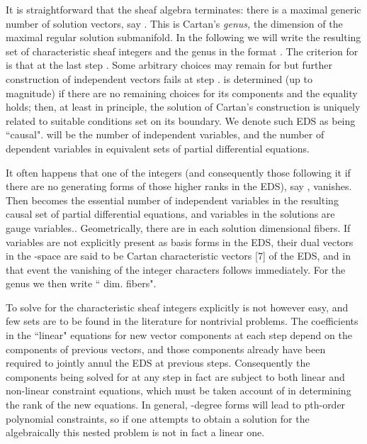 \documentclass[a4paper,a4paper]{article}
\begin{document}
        It is straightforward \cite{est89} that the sheaf algebra
terminates:  there is a maximal generic number of solution vectors,  say
\coordHE{}.  This is Cartan's {\itshape genus,  }the dimension of the maximal regular 
solution submanifold.  In the following we will write the resulting set of characteristic sheaf
integers and the genus in the format \coordHE{}.  The criterion for \coordHE{} is that at the last step \coordHE{}.  Some arbitrary choices may
remain for \coordHE{} but further construction of independent
vectors fails at step \coordHE{}.  \coordHE{} is determined  (up to magnitude)
if there are no remaining choices for its components and the equality
holds; then,  at least in principle,  the solution of Cartan's construction is
uniquely related to suitable conditions set on its boundary.  We denote
such EDS as being ``causal".   \coordHE{} will be the number of independent variables,
and \coordHE{} the number of dependent variables in equivalent sets of
partial differential equations.

        It often happens that one of the integers (and consequently
those following it if there are no generating forms of those higher
ranks in the EDS), say \coordHE{},  vanishes.  Then \coordHE{} becomes the essential number of
independent variables in the resulting causal set of partial
differential equations, and \coordHE{} variables in the solutions are gauge variables..
Geometrically,   there are in each solution \coordHE{}dimensional fibers.
If \coordHE{} variables are not explicitly present as basis forms in the EDS, their dual vectors
in the \coordHE{}-space are said to be Cartan characteristic vectors [7] of the
EDS,
and in that event the vanishing of the integer characters
\coordHE{} follows immediately.   For the genus \coordHE{} we then
write ``\coordHE{} dim. fibers".

        To solve for the characteristic sheaf integers \coordHE{}
explicitly is not however easy,  and few sets are to be found in the
literature for nontrivial problems.  The coefficients in the ``linear" equations
for new vector components at each step depend on the components of
previous vectors,  and those components already have been required to jointly
annul the EDS at previous steps.  Consequently the components being
solved for at any step in fact are subject to both linear and non-linear constraint
equations,  which must be taken account of in determining the rank of
the new equations.  In general,  \coordHE{}-degree forms will lead to pth-order
polynomial constraints,  so if one attempts to obtain a solution for the
\coordHE{} algebraically this nested problem is not in fact a linear one.
\end{document}
